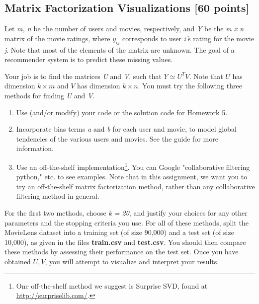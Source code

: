 \subsection{Matrix Factorization Visualizations [60 points]}
Let \textit{m, n} be the number of users and movies, respectively, and \textit{Y} be the \textit{m x n} matrix of the movie ratings, where $y_{ij}$ corresponds to user \textit{i'}s rating for the movie \textit{j}. Note that most of the elements of the matrix are unknown. The goal of a recommender system is to predict these missing values.

Your job is to find the matrices \textit{U} and \textit{V}, such that ${Y}\simeq{U^TV}$. Note that $U$ has dimension $k \times m$ and $V$ has dimension $k \times n$. You must try the following three methods for finding \textit{U} and \textit{V}.

\begin{enumerate}
	\item Use (and/or modify) your code or the solution code for Homework 5.
	\item Incorporate bias terms \textit{a} and \textit{b} for each user and movie, to model global tendencies of the various users and movies. See the guide for more information.
	\item Use an off-the-shelf implementation\footnote{One off-the-shelf method we suggest is Surprise SVD, found at \url{http://surpriselib.com/}.}. You can Google "collaborative filtering python,"  etc. to see examples. Note that in this assignment, we want you to try an off-the-shelf matrix factorization method, rather than any collaborative filtering method in general.
\end{enumerate}

For the first two methods, choose \textit{k = 20}, and justify your choices for any other parameters and the stopping criteria you use. For all of these methods, split the MovieLens dataset into a training set (of size 90,000) and a test set (of size 10,000), as given in the files \textbf{train.csv} and \textbf{test.csv}. You should then compare these methods by assessing their performance on the test set. Once you have obtained $U,V$, you will attempt to visualize and interpret your results.

